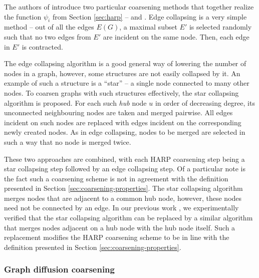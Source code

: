 The authors of \cite{chen_harp_2018} introduce two particular coarsening methods that together realize the function \( \psi_i \) from Section \ref{sec:harp} --  and . Edge collapsing is a very simple method -- out of all the edges \( E \left( G \right) \), a maximal subset \( E' \) is selected randomly such that no two edges from \( E' \) are incident on the same node. Then, each edge in \( E' \) is contracted.

The edge collapsing algorithm is a good general way of lowering the number of nodes in a graph, however, some structures are not easily collapsed by it. An example of such a structure is a \enquote{star} -- a single node connected to many other nodes. To coarsen graphs with such structures effectively, the star collapsing algorithm is proposed. For each such \textit{hub} node \( u \) in order of decreasing degree, its unconnected neighbouring nodes are taken and merged pairwise. All edges incident on such nodes are replaced with edges incident on the corresponding newly created nodes. As in edge collapsing, nodes to be merged are selected in such a way that no node is merged twice.

These two approaches are combined, with each HARP coarsening step being a star collapsing step followed by an edge collapsing step. Of a particular note is the fact such a coarsening scheme is not in agreement with the definition presented in Section \ref{sec:coarsening-properties}. The star collapsing algorithm merges nodes that are adjacent to a common hub node, however, these nodes need not be connected by an edge. In our previous work \cite{dedic_graph_2021}, we experimentally verified that the star collapsing algorithm can be replaced by a similar algorithm that merges nodes adjacent on a hub node with the hub node itself. Such a replacement modifies the HARP coarsening scheme to be in line with the definition presented in Section \ref{sec:coarsening-properties}.

\subsubsection{Graph diffusion coarsening}

